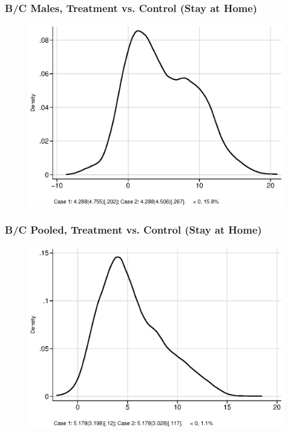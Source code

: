 \documentclass[static]{JJH-Beamer}
\begin{document}
\begin{frame}
\frametitle{B/C Males, Treatment vs. Control (Stay at Home)} 
\begin{figure}
	\includegraphics[width=.8\columnwidth]{output/ratios_5_sexm.eps}
\end{figure}
\end{frame}


\begin{frame}
\frametitle{B/C Pooled, Treatment vs. Control (Stay at Home)} 
\begin{figure}
	\includegraphics[width=.8\columnwidth]{output/ratios_5_sexp.eps}
\end{figure}
\end{frame}

\end{document}
